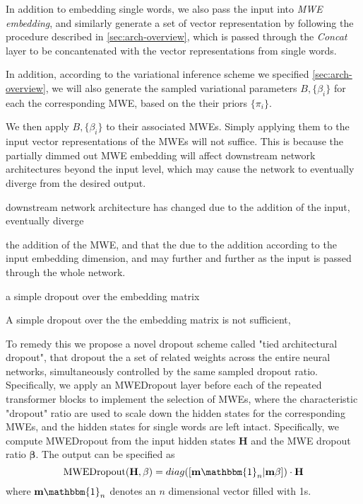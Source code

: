 In addition to embedding single words, 
we also pass the input into \textit{MWE embedding}, and similarly generate a set of vector representation 
by following the procedure described in  \autoref{sec:arch-overview}, which is passed through the \textit{Concat} layer to be 
concantenated with the vector representations  from single words.

In addition, according to the variational inference scheme we specified \autoref{sec:arch-overview}, 
we will also generate the 
sampled variational parameters $B, \{\beta_i\}$ for each the corresponding MWE, based on the their priors $\{\pi_i \}$. 

We then apply $B, \{\beta_i\}$ to their associated MWEs. Simply applying them to the input vector representations of the MWEs will not suffice. 
This is because 
the partially dimmed out MWE embedding will affect downstream network architectures beyond the input level, which may cause the network to eventually diverge from the desired output.


downstream network architecture  has changed due to the addition of the input, eventually diverge 

the addition of the MWE, and that the 
due to the addition 
according to the input embedding dimension, 
and may further and further as the input is passed through the whole network.

a simple dropout over the embedding matrix 

A simple dropout over the the embedding matrix is not sufficient, 

To remedy this we propose a novel dropout scheme called "tied architectural dropout", that dropout the a set of related weights across the entire neural networks, simultaneously controlled by the same sampled dropout ratio.
Specifically, we apply an MWEDropout layer 
before each of the repeated transformer blocks\cite{devlin2018bert}
to implement the selection of MWEs, where the characteristic "dropout" ratio are used to scale down the hidden states for the corresponding MWEs, and the hidden states for single words are left intact.  
Specifically, we compute MWEDropout from the input hidden states $\mathbf{H}$ and the MWE dropout ratio $\bm{\beta}$. 
The output can be specified as 
\begin{equation}
   \mathrm{MWEDropout}(\mathbf{H}, \mathbf{\beta}) =  diag([\bm{{\mathbbm{1}}}_n \vert \bm{\beta}]) \cdot \mathbf{H}
\end{equation}
where $\bm{{\mathbbm{1}}}_n$ denotes an $n$ dimensional vector filled with 1s.

